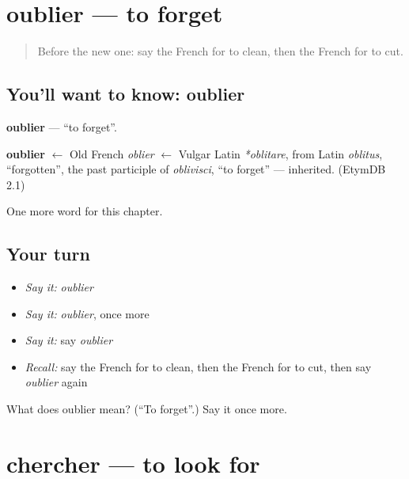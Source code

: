 \section[oublier]{oublier — to forget}

\label{lesson:FR-C63-oublier}



\begin{quote}
Before the new one: say the French for to clean, then the French for to cut.
\end{quote}

\subsection*{You'll want to know: oublier}
\textbf{oublier} — \textquotedblleft{}to forget\textquotedblright{}.

\begin{cousinweb}
\textbf{oublier} $\leftarrow$ Old French \emph{oblier} $\leftarrow$ Vulgar Latin \emph{*oblitare}, from Latin \emph{oblitus}, \textquotedblleft{}forgotten\textquotedblright{}, the past participle of \emph{oblivisci}, \textquotedblleft{}to forget\textquotedblright{} — inherited. (EtymDB 2.1)
\end{cousinweb}

\begin{grammarlens}[title={What you've built}]
One more word for this chapter.
\end{grammarlens}

\subsection*{Your turn}
\begin{itemize}
\raggedright
  \item \emph{Say it:} \emph{oublier}
  \item \emph{Say it:} \emph{oublier}, once more
  \item \emph{Say it:} say \emph{oublier}
  \item \emph{Recall:} say the French for to clean, then the French for to cut, then say \emph{oublier} again
\end{itemize}

\begin{tcolorbox}[breakable,colback=teal!4,colframe=teal!35!black,title={Before you move on}]
What does oublier mean? (\textquotedblleft{}To forget\textquotedblright{}.) Say it once more.
\end{tcolorbox}
\section[chercher]{chercher — to look for}


